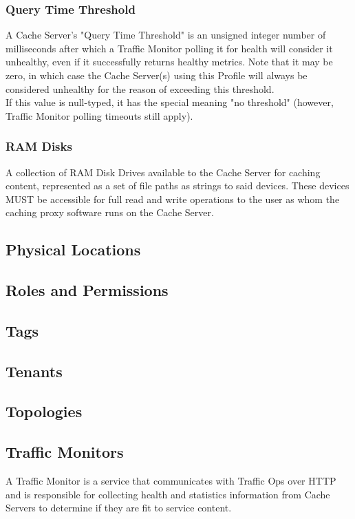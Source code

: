 \subsubsection{Query Time Threshold}
A Cache Server's "Query Time Threshold" is an unsigned integer number of
milliseconds after which a Traffic Monitor polling it for health will consider
it unhealthy, even if it successfully returns healthy metrics. Note that it may
be zero, in which case the Cache Server(s) using this Profile will always be
considered unhealthy for the reason of exceeding this threshold.\\
If this value is null-typed, it has the special meaning "no threshold"
(however, Traffic Monitor polling timeouts still apply).

\subsubsection{RAM Disks}
A collection of RAM Disk Drives available to the Cache Server for caching
content, represented as a set of file paths as strings to said devices. These
devices MUST be accessible for full read and write operations to the user as
whom the caching proxy software runs on the Cache Server.

\subsection{Physical Locations}



\subsection{Roles and Permissions\label{sec:roles-and-perms}}



\subsection{Tags}



\subsection{Tenants}


\subsection{Topologies}


\subsection{Traffic Monitors}
A Traffic Monitor is a service that communicates with Traffic Ops over HTTP and
is responsible for collecting health and statistics information from Cache
Servers to determine if they are fit to service content.

